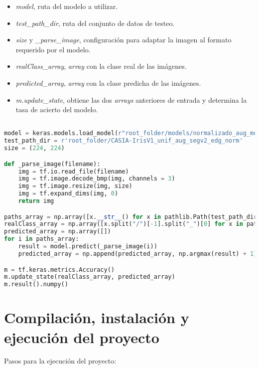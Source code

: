 {\begin{itemize}
    \item \textit{model}, ruta del modelo a utilizar.
    \item \textit{test\_path\_dir}, ruta del conjunto de datos de testeo.
    \item \textit{size} y \textit{\_parse\_image}, configuración para adaptar la imagen al formato requerido por el modelo.
    \item \textit{realClass\_array}, \textit{array} con la clase real de las imágenes.
    \item \textit{predicted\_array}, \textit{array} con la clase predicha de las imágenes.
    \item \textit{m.update\_state}, obtiene las dos \textit{arrays} anteriores de entrada y determina la tasa de acierto del modelo.
\end{itemize}

\begin{lstlisting}[language=Python] 

model = keras.models.load_model(r"root_folder/models/normalizado_aug_modelv1")
test_path_dir = r'root_folder/CASIA-IrisV1_unif_aug_segv2_edg_norm'
size = (224, 224)

def _parse_image(filename):
    img = tf.io.read_file(filename)
    img = tf.image.decode_bmp(img, channels = 3)
    img = tf.image.resize(img, size)
    img = tf.expand_dims(img, 0)
    return img

paths_array = np.array([x.__str__() for x in pathlib.Path(test_path_dir).rglob('*.bmp')])
realClass_array = np.array([x.split("/")[-1].split("_")[0] for x in paths_array]).astype(int)
predicted_array = np.array([])
for i in paths_array:
    result = model.predict(_parse_image(i))
    predicted_array = np.append(predicted_array, np.argmax(result) + 1)

m = tf.keras.metrics.Accuracy()
m.update_state(realClass_array, predicted_array)
m.result().numpy()

\end{lstlisting}

\section{Compilación, instalación y ejecución del proyecto}

Pasos para la ejecución del proyecto:

}
